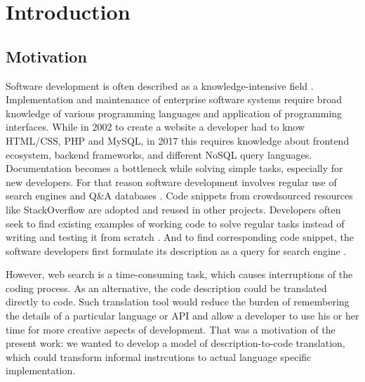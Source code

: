 \chapter{Introduction}
\label{Chapter1}

\newcommand{\keyword}[1]{\textbf{#1}}
\newcommand{\tabhead}[1]{\textbf{#1}}

\section{Motivation}
Software development is often described as a knowledge-intensive field \parencite{Robillard1999}. Implementation and maintenance of enterprise software systems require broad knowledge of various programming languages and application of programming interfaces. While in 2002 to create a website a developer had to know HTML/CSS, PHP and MySQL, in 2017 this requires knowledge about frontend ecosystem, backend frameworks, and different NoSQL query languages. Documentation becomes a bottleneck while solving simple tasks, especially for new developers. For that reason software development involves regular use of search engines and Q\&A databases \parencite{Treude2011}. Code snippets from crowdsourced resources like StackOverflow are adopted and reused in other projects. Developers often seek to find existing examples of working code to solve regular tasks instead of writing and testing it from scratch \parencite{Brandt2010}. And to find corresponding code snippet, the software developers first formulate its description as a query for search engine \parencite{Brandt2009}. 

However, web search is a time-consuming task, which causes interruptions of the coding process. As an alternative, the code description could be translated directly to code. Such translation tool would reduce the burden of remembering the details of a particular language or API and allow a developer to use his or her time for more creative aspects of development. That was a motivation of the present work: we wanted to develop a model of description-to-code translation, which could transform informal instrcutions to actual language specific implementation.




